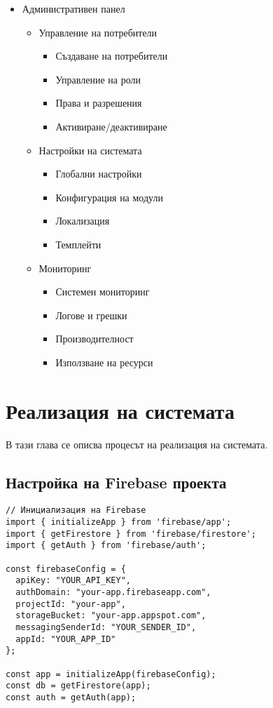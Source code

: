 \documentclass[12pt,a4paper]{article}
\begin{document}
\begin{itemize}
    \item Административен панел
    \begin{itemize}
        \item Управление на потребители
        \begin{itemize}
            \item Създаване на потребители
            \item Управление на роли
            \item Права и разрешения
            \item Активиране/деактивиране
        \end{itemize}
        \item Настройки на системата
        \begin{itemize}
            \item Глобални настройки
            \item Конфигурация на модули
            \item Локализация
            \item Темплейти
        \end{itemize}
        \item Мониторинг
        \begin{itemize}
            \item Системен мониторинг
            \item Логове и грешки
            \item Производителност
            \item Използване на ресурси
        \end{itemize}
    \end{itemize}
\end{itemize}

\section{Реализация на системата}
В тази глава се описва процесът на реализация на системата.

\subsection{Настройка на Firebase проекта}
\begin{verbatim}
// Инициализация на Firebase
import { initializeApp } from 'firebase/app';
import { getFirestore } from 'firebase/firestore';
import { getAuth } from 'firebase/auth';

const firebaseConfig = {
  apiKey: "YOUR_API_KEY",
  authDomain: "your-app.firebaseapp.com",
  projectId: "your-app",
  storageBucket: "your-app.appspot.com",
  messagingSenderId: "YOUR_SENDER_ID",
  appId: "YOUR_APP_ID"
};

const app = initializeApp(firebaseConfig);
const db = getFirestore(app);
const auth = getAuth(app);
\end{verbatim}
\end{document}
